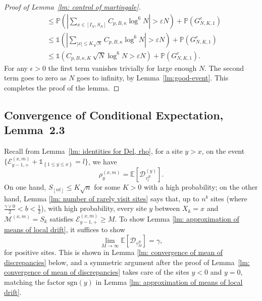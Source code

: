 \documentclass[EJP]{ejpecp} %
\begin{document}
\begin{proof}[Proof of Lemma~\ref{lm: control of martingale}]
\begin{align*}
		&\le \mathbb{P}\left( \left| \sum_{x \in \left[ I_N, S_N \right]} C_{p, B, \kappa} \log^6 N  \right| > \varepsilon  N \right) + \mathbb{P}\left( G_{N, K, 1}^c \right)  \\
		&\le \mathbb{1}\left(  \left| \sum_{|x| \le K \sqrt{N} } C_{p, B, \kappa} \log^6 N \right| > \varepsilon  N  \right) + \mathbb{P}\left( G_{N, K, 1}^c \right)  \\
		&\le \mathbb{1}\left(  C_{p, B, \kappa, K} \, \sqrt{N} \log^6 N > \varepsilon  N  \right) + \mathbb{P}\left( G_{N, K, 1}^c \right) 
		.\end{align*}
	For any $\epsilon > 0$ the first term vanishes trivially for large enough $N$. The second term goes to zero as $N$ goes to infinity, by Lemma~\ref{lm:good-event}. This completes the proof of the lemma.
\end{proof}



\subsection{Convergence of Conditional Expectation, Lemma~2.3}
\label{sec:RhoGamma}
Recall from Lemma~\ref{lm: identities for Del, rho}, for a site $y> x$, 
on the event $\{\mathcal{E}^{(x,m)}_{y-1,+} +\mathbb{1}_{\left\{1\leq y\leq x\right\}} = l\}$, we have
\[
\rho^{(x,m)}_y = \mathbb{E}\left[\mathscr{D}_{\tau_l^{\mathscr{B}}}^{(y)}\right]
.\]
On one hand, $S_{\left\lfloor n t\right\rfloor} \leq K\sqrt{n} $ for some $K>0$ with a high probability; on the other hand, Lemma \ref{lm: number of rarely visit sites} says that, up to $n^b$ sites (where $\frac{\gamma \vee 0}{2}<b<\frac{1}{2}$), with high probability, every site $y$ between $X_k=x$ and $\mathcal{M}^{(x,m)} =S_{k}$ satisfies $ \mathcal{E}^{(x,m)}_{y-1,+} \geq M $. To show Lemma \ref{lm: approximation of means of local drift}, it suffices to show 
\begin{equation}\label{eq: convergence of conditional expectation}
	\lim_{M\to\infty} \mathbb{E}[\mathscr{D}_{\tau_M^{\mathscr{B}}}] = \gamma , 
\end{equation} 
for positive sites. This is shown in Lemma \ref{lm: convergence of mean of discrepancies} below, and a symmetric argument after the proof of Lemma~\ref{lm: convergence of mean of discrepancies} takes care of the sites $y<0$ and $y=0$, matching the factor $\text{sgn}(y)$ in Lemma \ref{lm: approximation of means of local drift}.
\end{document}
